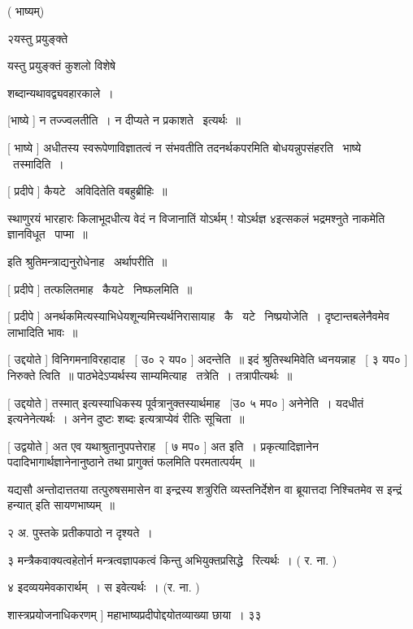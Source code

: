 \documentclass[11pt, openany]{book}
\begin{document}
 ( भाष्यम्) 

२यस्तु प्रयुङ्क्ते \textendash\ 

यस्तु प्रयुङ्क्तं कुशलो विशेषे 

शब्दान्यथावद्व्यवहारकाले~। 



 [भाष्ये ] न तज्ज्वलतीति~। न दीप्यते न प्रकाशते \textendash\ इत्यर्थः~॥ 

 [ भाष्ये ] अधीतस्य स्वरूपेणाविज्ञातत्वं न संभवतीति तदनर्थकपरमिति
बोधयन्नुपसंहरति \textendash\ भाष्ये \textendash\ तस्मादिति~। 

 [ प्रदीपे ] कैयटे \textendash\ अविदितेति वबहुब्रीहिः~॥ 

{\qt स्थाणुरयं भारहारः किलाभूदधीत्य वेदं न विजानातिं योऽर्थम् ! योऽर्थज्ञ ४इत्सकलं भद्रमश्नुते नाकमेति ज्ञानविधूत \textendash\ पाप्मा~॥}

 इति श्रुतिमन्त्राद्यनुरोधेनाह \textendash\ अर्थापरीति~॥ 

 [ प्रदीपे ] तत्फलितमाह \textendash\ कैयटे \textendash\ निष्फलमिति~॥ 

 [ प्रदीपे ] अनर्थकमित्यस्याभिधेयशून्यमित्त्यर्थनिरासायाह \textendash\ कै \textendash\ 
यटे \textendash\ निष्प्रयोजेति~। दृष्टान्तबलेनैवमेव लाभादिति भावः~॥ 

 [ उद्दयोते ] विनिगमनाविरहादाह \textendash\ [ उ० २ यप० ] अदन्तेति~॥ इदं
श्रुतिस्थमिवेति ध्वनयन्नाह \textendash\ [ ३ यप० ] {\qt निरुक्ते त्विति~॥}
पाठभेदेऽप्यर्थस्य साम्यमित्याह \textendash\ तत्रेति~। तत्रापीत्यर्थः~॥ 

 [ उद्दयोते ] {\qt तस्मात्} इत्यस्याधिकस्य
पूर्वत्रानुक्तस्यार्थमाह \textendash\ [उ० ५ मप० ] अनेनेति~। {\qt यदधीतं}
इत्यनेनेत्यर्थः~। अनेन {\qt दुष्टः शब्दः} इत्यत्राप्येवं रीतिः सूचिता~॥ 

 [ उद्वयोते ] अत एव यथाश्रुतानुपपत्तेराह \textendash\ [ ७ मप० ] अत इति~। 
प्रकृत्यादिज्ञानेन पदादिभागार्थज्ञानेनानुष्ठाने तथा प्रागुक्तं फलमिति
परमतात्पर्यम्~॥



यद्यसौ अन्तोदात्ततया तत्पुरुषसमासेन वा इन्द्रस्य शत्रुरिति
व्यस्तनिर्देशेन वा ब्रूयात्तदा निश्चितमेव स इन्द्रं हन्यात् इति
सायणभाष्यम्~॥ 

२ अ. पुस्तके प्रतीकपाठो न दृश्यते~। 

३ मन्त्रैकवाक्यत्वहेतोर्न मन्त्रत्वज्ञापकत्वं किन्तु अभियुक्तप्रसिद्धे \textendash\ 
रित्यर्थः~। ( र. ना. ) 

४ इदव्ययमेवकारार्थम्~। स इवेत्यर्थः~। (र. ना. ) 

शास्त्रप्रयोजनाधिकरणम् ] महाभाष्यप्रदीपोद्दयोतव्याख्या छाया~। ३३ 
\end{document}
